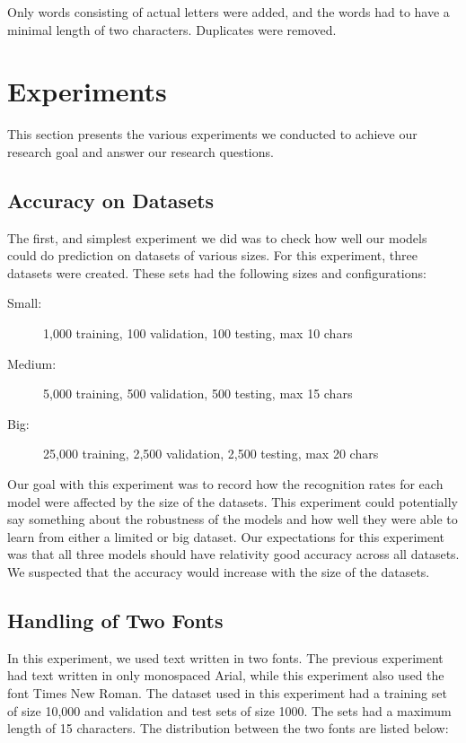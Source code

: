 Only words consisting of actual letters were added, and the words had to have a minimal length of two characters. Duplicates were removed.


\section{Experiments}
\label{sec:experiments_details}
This section presents the various experiments we conducted to achieve our research goal and answer our research questions.

\subsection{Accuracy on Datasets}
\label{sec:accuracy_on_datasets}
The first, and simplest experiment we did was to check how well our models could do prediction on datasets of various sizes. For this experiment, three datasets were created. These sets had the following sizes and configurations:

\begin{description}
    \item[Small:]{1,000 training, 100 validation, 100 testing, max 10 chars}
    \item[Medium:]{5,000 training, 500 validation, 500 testing, max 15 chars}
    \item[Big:]{25,000 training, 2,500 validation, 2,500 testing, max 20 chars}
\end{description}

Our goal with this experiment was to record how the recognition rates for each model were affected by the size of the datasets. This experiment could potentially say something about the robustness of the models and how well they were able to learn from either a limited or big dataset. Our expectations for this experiment was that all three models should have relativity good accuracy across all datasets. We suspected that the accuracy would increase with the size of the datasets.

\subsection{Handling of Two Fonts}
In this experiment, we used text written in two fonts. The previous experiment had text written in only monospaced Arial, while this experiment also used the font Times New Roman. The dataset used in this experiment had a training set of size 10,000 and validation and test sets of size 1000. The sets had a maximum length of 15 characters. The distribution between the two fonts are listed below:

